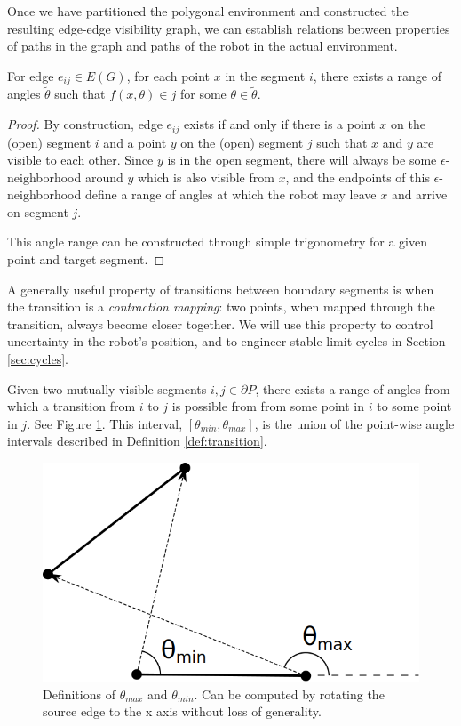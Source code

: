 \documentclass[]{styles/svproc}  %
\begin{document}
Once we have partitioned the polygonal environment and constructed the resulting
edge-edge visibility graph, we can establish relations between properties of
paths in the graph and paths of the robot in the actual environment.

\begin{definition}\label{def:transition}
For edge $e_{ij} \in E(G)$, for each point $x$ in the segment $i$, there 
exists a range of angles $\tilde{\theta}$ such that $f(x,\theta) \in j$ for
some $\theta \in \tilde{\theta}$.
\end{definition}

\begin{proof}
By construction, edge $e_{ij}$ exists if and only if there is a point $x$ on the (open)
segment $i$ and a point $y$ on the (open) segment $j$ such that $x$ and $y$ are
visible to each other. Since $y$ is in the open segment, there will always be some $\epsilon$-neighborhood around
$y$ which is also visible from $x$, and the endpoints of this
$\epsilon$-neighborhood define a range of angles at which the robot may leave
$x$ and arrive on segment $j$.

This angle range can be constructed through simple trigonometry for a
given point and target segment.
\end{proof}

A generally useful property of transitions between boundary segments is when the
transition is a \emph{contraction mapping}: two points, when mapped through the
transition, always become closer together. We will use this property to control
uncertainty in the robot's position, and to engineer stable limit cycles in
Section \ref{sec:cycles}.


\begin{definition} \label{def:angrange}
Given two mutually visible segments $i,j \in \partial P$, there exists a range 
of angles from which a transition from $i$ to $j$ is possible from from some
point in $i$ to some point in $j$.
See Figure \ref{fig:bounce_range}. This interval, $[\theta_{min}, \theta_{max}]$, 
is the union of the point-wise angle intervals described in Definition
\ref{def:transition}.
\end{definition}

\begin{figure}
    \centering
    \includegraphics[width=0.4\linewidth]{figures/bouncerange.png}
    \caption{Definitions of $\theta_{max}$ and $\theta_{min}$. Can be computed
by rotating the source edge to the x axis without loss of generality.}
\label{fig:bounce_range}
\end{figure}
\end{document}
